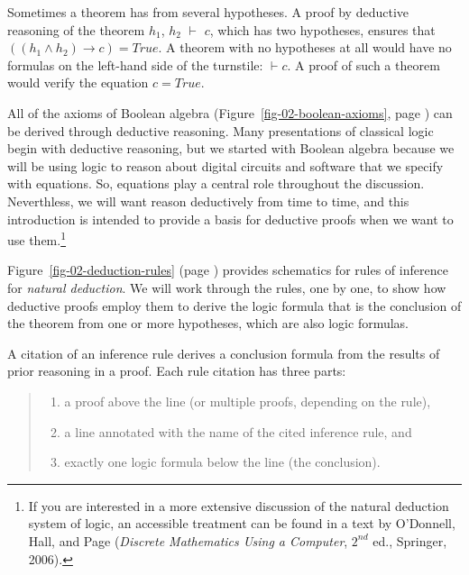 Sometimes a theorem has from several hypotheses.
A proof by deductive reasoning of the theorem
$h_1$, $h_2$ $\vdash$ $c$,
which has two hypotheses,
ensures that
$((h_1 \wedge h_2) \rightarrow c) = True$.
A theorem with no hypotheses at all
would have no formulas on the left-hand side of the turnstile:
$\vdash c$.
A proof of such a theorem would
verify the equation $c = True$.

All of the axioms of Boolean algebra
(Figure~\ref{fig-02-boolean-axioms}, page \pageref{fig-02-boolean-axioms})
can be derived through deductive reasoning.
Many presentations of classical logic begin with deductive reasoning,
but we started with Boolean algebra
because we will be using logic to reason about
digital circuits and software that we
specify with equations.
So, equations play a central role throughout the discussion.
Neverthless, we will want reason deductively from time to time,
and this introduction is intended to provide a basis for
deductive proofs when we want to use them.\footnote{If
you are interested in a more extensive discussion of the natural deduction
system of logic, an accessible treatment can be found
in a text by O'Donnell, Hall, and Page
(\emph{Discrete Mathematics Using a Computer}, $2^{nd}$ ed., Springer, 2006).}

Figure~\ref{fig-02-deduction-rules} (page \pageref{fig-02-deduction-rules})
provides schematics for rules of inference for \emph{natural deduction}.
We will work through the rules, one by one,
to show how deductive proofs employ
them to derive the logic formula that is the conclusion of the theorem
from one or more hypotheses, which are also logic formulas.

A citation of an inference rule derives a conclusion formula
from the results of prior reasoning in a proof.
Each rule citation has three parts:
\begin{quote}
\begin{enumerate}
\item a proof above the line (or multiple proofs, depending on the rule),
\item a line annotated with the name of the cited inference rule, and
\item exactly one logic formula below the line (the conclusion).
\end{enumerate}
\end{quote}

